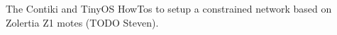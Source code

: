 The \href{https://github.com/koanlogic/webthings/bits}{} Contiki and TinyOS HowTos to setup a constrained network based on Zolertia Z1 motes (TODO Steven).
